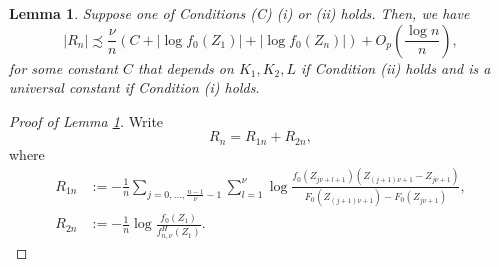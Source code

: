 \documentclass[12pt,letterpaper, twoside, openany]{article}
\theoremstyle{plain}
\newtheorem{lemma}[theorem]{Lemma}
\begin{document}
\begin{lemma}\label{lemma:Rn_terms}
Suppose one of Conditions (C) (i) or (ii) holds.
Then, we have
\begin{equation*}
    |R_n| \precsim \frac{\nu}{n}(C + |\log f_0(Z_1)| + |\log f_0(Z_n)|) +O_p\left(\frac{\log n}{n}\right),
\end{equation*}
for some constant $C$ that depends on $K_1,K_2, L$ if Condition (ii) holds and is a universal constant if Condition (i) holds.
\end{lemma}

\begin{proof}[Proof of Lemma \ref{lemma:Rn_terms}]
	Write
\begin{equation*}
	R_n = R_{1n} + R_{2n},
\end{equation*}
where
\begin{align*}
R_{1n} &:=	- \frac{1}{n} \sum_{j=0,\ldots,\frac{n-1}{\nu} - 1} 
	\sum^\nu_{l=1} \log \frac{f_0(Z_{j\nu+l+1})(Z_{(j+1)\nu+1} - Z_{j\nu+1})}{F_0(Z_{(j+1)\nu+1}) - F_0(Z_{j\nu+1})},\\
	R_{2n} &:= -\frac{1}{n}\log \frac{f_0(Z_1)}{f^H_{n,\nu}(Z_1)}.
\end{align*}


\end{proof}
\end{document}
